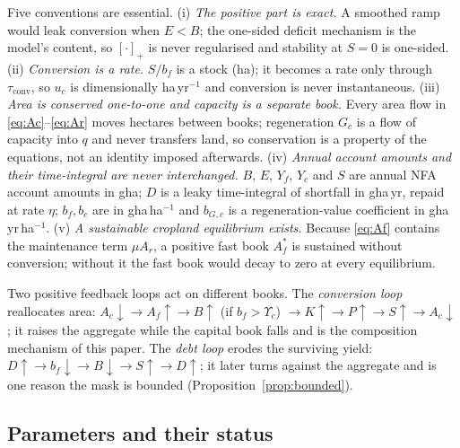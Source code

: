 \documentclass[preprint,12pt,authoryear]{elsarticle}
\newcommand{\pos}[1]{\left[#1\right]_+}
\newcommand{\Ups}{\Upsilon_c}
\newcommand{\tconv}{\tau_{\mathrm{conv}}}
\begin{document}
Five conventions are essential. (i) \emph{The positive part is exact.} A smoothed ramp would leak conversion when $E<B$; the one-sided deficit mechanism is the model's content, so $\pos{\cdot}$ is never regularised and stability at $S=0$ is one-sided. (ii) \emph{Conversion is a rate.} $S/b_f$ is a stock (ha); it becomes a rate only through $\tconv$, so $u_c$ is dimensionally ha\,yr$^{-1}$ and conversion is never instantaneous. (iii) \emph{Area is conserved one-to-one and capacity is a separate book.} Every area flow in \eqref{eq:Ac}--\eqref{eq:Ar} moves hectares between books; regeneration $G_c$ is a flow of capacity into $q$ and never transfers land, so conservation is a property of the equations, not an identity imposed afterwards. (iv) \emph{Annual account amounts and their time-integral are never interchanged.} $B$, $E$, $Y_f$, $Y_c$ and $S$ are annual NFA account amounts in gha; $D$ is a leaky time-integral of shortfall in gha\,yr, repaid at rate $\eta$; $b_f,b_c$ are in gha\,ha$^{-1}$ and $b_{G,c}$ is a regeneration-value coefficient in gha\,yr\,ha$^{-1}$. (v) \emph{A sustainable cropland equilibrium exists.} Because \eqref{eq:Af} contains the maintenance term $\mu A_r$, a positive fast book $A_f^*$ is sustained without conversion; without it the fast book would decay to zero at every equilibrium.

Two positive feedback loops act on different books. The \emph{conversion loop} reallocates area: $A_c\downarrow\to A_f\uparrow\to B\uparrow$ (if $b_f>\Ups$) $\to K\uparrow\to P\uparrow\to S\uparrow\to A_c\downarrow$; it raises the aggregate while the capital book falls and is the composition mechanism of this paper. The \emph{debt loop} erodes the surviving yield: $D\uparrow\to b_f\downarrow\to B\downarrow\to S\uparrow\to D\uparrow$; it later turns against the aggregate and is one reason the mask is bounded (Proposition~\ref{prop:bounded}).

\subsection{Parameters and their status}\label{sec:params}
\end{document}

